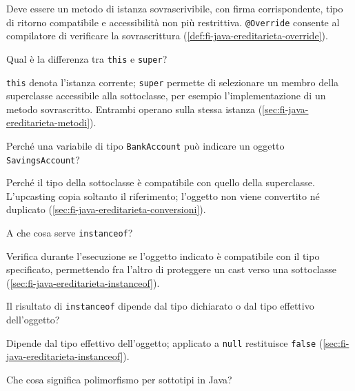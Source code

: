 Deve essere un metodo di istanza sovrascrivibile, con firma corrispondente,
tipo di ritorno compatibile e accessibilità non più restrittiva.
\texttt{@Override} consente al compilatore di verificare la sovrascrittura
(\cref{def:fi-java-ereditarieta-override}).

\begin{exercise}
\label{ex:fi-esercizi-java-ereditarieta-this-super}
Qual è la differenza tra \texttt{this} e \texttt{super}?
\end{exercise}

\texttt{this} denota l'istanza corrente; \texttt{super} permette di
selezionare un membro della superclasse accessibile alla sottoclasse,
per esempio l'implementazione di un metodo sovrascritto. Entrambi
operano sulla stessa istanza (\cref{sec:fi-java-ereditarieta-metodi}).

\begin{exercise}
\label{ex:fi-esercizi-java-ereditarieta-upcast}
Perché una variabile di tipo \texttt{BankAccount} può indicare un oggetto
\texttt{SavingsAccount}?
\end{exercise}

Perché il tipo della sottoclasse è compatibile con quello della superclasse.
L’upcasting copia soltanto il riferimento; l’oggetto non viene convertito né
duplicato (\cref{sec:fi-java-ereditarieta-conversioni}).

\begin{exercise}
\label{ex:fi-esercizi-java-ereditarieta-instanceof}
A che cosa serve \texttt{instanceof}?
\end{exercise}

Verifica durante l’esecuzione se l’oggetto indicato è compatibile con il
tipo specificato, permettendo fra l’altro di proteggere un cast verso una
sottoclasse (\cref{sec:fi-java-ereditarieta-instanceof}).

\begin{exercise}
\label{ex:fi-esercizi-java-ereditarieta-instanceof-tipo}
Il risultato di \texttt{instanceof} dipende dal tipo dichiarato o dal tipo
effettivo dell’oggetto?
\end{exercise}

Dipende dal tipo effettivo dell’oggetto; applicato a \texttt{null}
restituisce \texttt{false} (\cref{sec:fi-java-ereditarieta-instanceof}).

\begin{exercise}
\label{ex:fi-esercizi-java-ereditarieta-polimorfismo}
Che cosa significa polimorfismo per sottotipi in Java?
\end{exercise}

